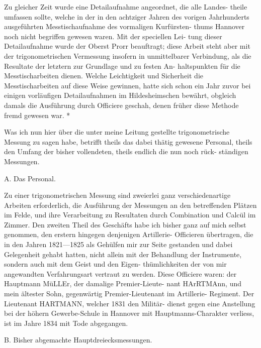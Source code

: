 \documentclass[12pt,a4paper]{article}
\theoremstyle{plain}
\theoremstyle{definition}
\theoremstyle{remark}
\begin{document}

\noindent

\noindent
Zu gleicher Zeit wurde eine Detailaufnahme angeordnet, die alle Landes-
theile umfassen sollte, welche in der in den achtziger Jahren des vorigen
Jahrhunderts ausgeführten Messtischaufnahme des vormaligen Kurfürsten-
thums Hannover noch nicht begriffen gewesen waren. Mit der speciellen Lei-
tung dieser Detailaufnahme wurde der Oberst Prorr beauftragt; diese Arbeit
steht aber mit der trigonometrischen Vermessung insofern in unmittelbarer
Verbindung, als die Resultate der letztern zur Grundlage und zu festen An-
haltspunkten für die Messtischarbeiten dienen. Welche Leichtigkeit und
Sicherheit die Messtischarbeiten auf diese Weise gewinnen, hatte sich schon
ein Jahr zuvor bei einigen vorläufigen Detailaufnahmen im Hildesheimschen
bewährt, obgleich damals die Ausführung durch Officiere geschah, denen
früher diese Methode fremd gewesen war. *

\noindent
Was ich nun hier über die unter meine Leitung gestellte trigonometrische
Messung zu sagen habe, betrifft theils das dabei thätig gewesene Personal,
theils den Umfang der bisher vollendeten, theils endlich die nun noch rück-
ständigen Messungen.

\noindent
A. Das Personal.

\noindent
Zu einer trigonometrischen Messung sind zweierlei ganz verschiedenartige
Arbeiten erforderlich, die Ausführung der Messungen an den betreffenden
Plätzen im Felde, und ihre Verarbeitung zu Resultaten durch Combination
und Calcül im Zimmer. Den zweiten Theil des Geschäfts habe ich bisher
ganz auf mich selbst genommen, den erstern hingegen denjenigen Artillerie-
Officieren übertragen, die in den Jahren 1821---1825 als Gehülfen mir zur
Seite gestanden und dabei Gelegenheit gehabt hatten, nicht allein mit der
Behandlung der Instrumente, sondern auch mit dem Geist und den Eigen-
thümlichkeiten der von mir angewandten Verfahrungsart vertraut zu werden.
Diese Officiere waren: der Hauptmann MüLLEr, der damalige Premier-Lieute-
nant HArRTMAnn, und mein ältester Sohn, gegenwärtig Premier-Lieutenant im
Artillerie- Regiment. Der Lieutenant HARTMANN, welcher 1831 den Militär-
dienst gegen eine Anstellung bei der höhern Gewerbe-Schule in Hannover mit
Hauptmanns-Charakter verliess, ist im Jahre 1834 mit Tode abgegangen.

\noindent

\noindent
B. Bisher abgemachte Hauptdreiecksmessungen.
\end{document}
